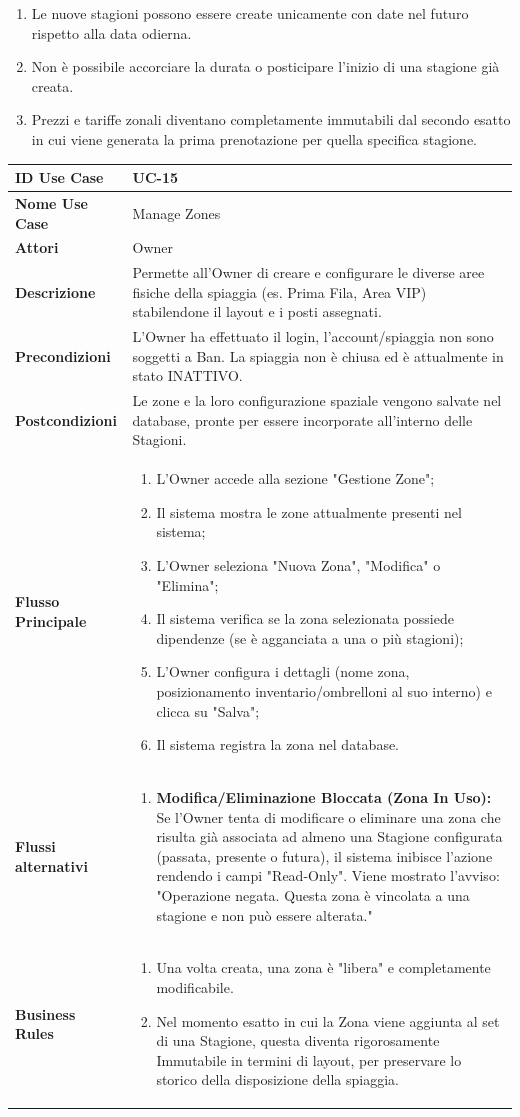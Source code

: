\documentclass{article}
\newcommand{\usecasetable}[9]{
	\begin{table}[h!]
		\centering
		\footnotesize
		\renewcommand{\arraystretch}{1.4}
		\begin{tabularx}{\textwidth}{|l|>{\raggedright\arraybackslash}X|}
			\hline
			\textbf{ID Use Case} & #1 \\ \hline
			\textbf{Nome Use Case} & #2 \\ \hline
			\textbf{Attori} & #3 \\ \hline
			\textbf{Descrizione} & #4 \\ \hline
			\textbf{Precondizioni} & #5 \\ \hline
			\textbf{Postcondizioni} & #6 \\ \hline
			\textbf{Flusso Principale} & #7 \\ \hline
			\textbf{Flussi alternativi} & #8 \\ \hline
			\textbf{Business Rules} & #9 \\ \hline
		\end{tabularx}
	\end{table}
}
\begin{document}
	{
		\begin{enumerate}[nosep, leftmargin=*]
			\item[•] Le nuove stagioni possono essere create unicamente con date nel futuro rispetto alla data odierna.
			\item[•] Non è possibile accorciare la durata o posticipare l'inizio di una stagione già creata.
			\item[•] Prezzi e tariffe zonali diventano completamente immutabili dal secondo esatto in cui viene generata la prima prenotazione per quella specifica stagione.
		\end{enumerate}
	}
		
	\newpage
	
	\usecasetable
	{UC-15}
	{Manage Zones}
	{Owner}
	{Permette all'Owner di creare e configurare le diverse aree fisiche della spiaggia (es. Prima Fila, Area VIP) stabilendone il layout e i posti assegnati.}
	{L'Owner ha effettuato il login, l'account/spiaggia non sono soggetti a Ban. La spiaggia non è chiusa ed è attualmente in stato INATTIVO.}
	{Le zone e la loro configurazione spaziale vengono salvate nel database, pronte per essere incorporate all'interno delle Stagioni.}
	{
		\begin{enumerate}[nosep, leftmargin=*]
			\item L'Owner accede alla sezione "Gestione Zone";
			\item Il sistema mostra le zone attualmente presenti nel sistema;
			\item L'Owner seleziona "Nuova Zona", "Modifica" o "Elimina";
			\item Il sistema verifica se la zona selezionata possiede dipendenze (se è agganciata a una o più stagioni);
			\item L'Owner configura i dettagli (nome zona, posizionamento inventario/ombrelloni al suo interno) e clicca su "Salva";
			\item Il sistema registra la zona nel database.
		\end{enumerate}
	}
	{
		\begin{enumerate}[nosep, leftmargin=25px]
			\item[\textbf{4a-e.}] \textbf{Modifica/Eliminazione Bloccata (Zona In Uso):} Se l'Owner tenta di modificare o eliminare una zona che risulta già associata ad almeno una Stagione configurata (passata, presente o futura), il sistema inibisce l'azione rendendo i campi "Read-Only". Viene mostrato l'avviso: "Operazione negata. Questa zona è vincolata a una stagione e non può essere alterata."
		\end{enumerate}
	}
	{
		\begin{enumerate}[nosep, leftmargin=*]
			\item[•] Una volta creata, una zona è "libera" e completamente modificabile.
			\item[•] Nel momento esatto in cui la Zona viene aggiunta al set di una Stagione, questa diventa rigorosamente Immutabile in termini di layout, per preservare lo storico della disposizione della spiaggia.
		\end{enumerate}
	}
		
\end{document}
